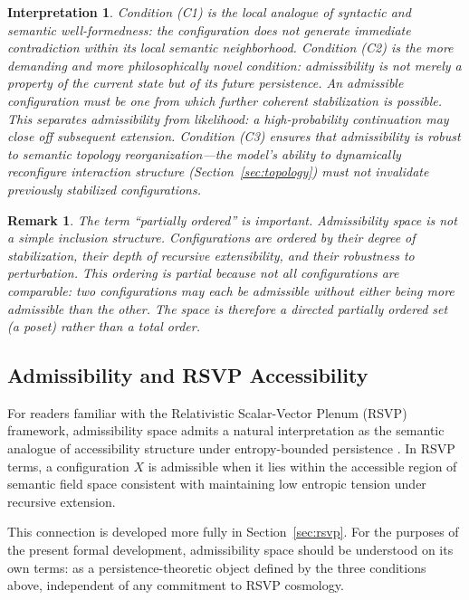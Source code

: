 \documentclass[11pt, a4paper]{article}
\theoremstyle{srn}
\theoremstyle{srnremark}
\newtheorem{interpretation}{Interpretation}[section]
\newtheorem{remark}{Remark}[section]
\begin{document}
\begin{interpretation}
Condition (C1) is the local analogue of syntactic and semantic
well-formedness: the configuration does not generate immediate
contradiction within its local semantic neighborhood.
Condition (C2) is the more demanding and more philosophically novel
condition: admissibility is not merely a property of the current state
but of its \emph{future persistence}.
An admissible configuration must be one from which further coherent
stabilization is possible.
This separates admissibility from likelihood: a high-probability
continuation may close off subsequent extension.
Condition (C3) ensures that admissibility is robust to semantic
topology reorganization---the model's ability to dynamically
reconfigure interaction structure (Section~\ref{sec:topology}) must
not invalidate previously stabilized configurations.
\end{interpretation}

\begin{remark}
The term ``partially ordered'' is important.
Admissibility space is not a simple inclusion structure.
Configurations are ordered by their degree of stabilization, their
depth of recursive extensibility, and their robustness to perturbation.
This ordering is partial because not all configurations are comparable:
two configurations may each be admissible without either being more
admissible than the other.
The space is therefore a directed partially ordered set (a
\emph{poset}) rather than a total order.
\end{remark}

\subsection{Admissibility and RSVP Accessibility}

For readers familiar with the Relativistic Scalar-Vector Plenum (RSVP)
framework, admissibility space admits a natural interpretation as the
semantic analogue of accessibility structure under entropy-bounded
persistence \citep[cf.]{barbour2003end}.
In RSVP terms, a configuration $X$ is admissible when it lies within
the accessible region of semantic field space consistent with
maintaining low entropic tension under recursive extension.

This connection is developed more fully in Section~\ref{sec:rsvp}.
For the purposes of the present formal development, admissibility
space should be understood on its own terms: as a persistence-theoretic
object defined by the three conditions above, independent of any
commitment to RSVP cosmology.
\end{document}
